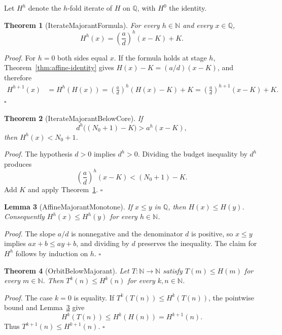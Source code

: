 \documentclass[11pt,letterpaper]{article}
\newcommand{\N}{\mathbb{N}}
\newcommand{\Q}{\mathbb{Q}}
\newcommand{\Map}[3]{#1 \colon #2 \to #3}
\newtheorem{theorem}{Theorem}
\newtheorem{lemma}[theorem]{Lemma}
\newenvironment{proof}{\noindent\textit{Proof.}}{\hfill\(\square\)}
\begin{document}
Let \(H^{h}\) denote the \(h\)-fold iterate of \(H\) on \(\Q\), with \(H^{0}\) the identity.

\begin{theorem}[IterateMajorantFormula]
\label{thm:iterate-formula}
For every \(h\in\N\) and every \(x\in\Q\),
\[
H^{h}(x)=\left(\frac{a}{d}\right)^{h}(x-K)+K.
\]
\end{theorem}

\begin{proof}
For \(h=0\) both sides equal \(x\). If the formula holds at stage \(h\), Theorem~\ref{thm:affine-identity} gives \(H(x)-K=(a/d)(x-K)\), and therefore
\begin{align*}
H^{h+1}(x)
&=H^{h}(H(x))
=\left(\frac{a}{d}\right)^{h}(H(x)-K)+K
=\left(\frac{a}{d}\right)^{h+1}(x-K)+K.
\end{align*}
\end{proof}

\begin{theorem}[IterateMajorantBelowCore]
\label{thm:iterate-budget}
If
\[
d^{h}\bigl((N_{0}+1)-K\bigr)>a^{h}(x-K),
\]
then \(H^{h}(x)<N_{0}+1\).
\end{theorem}

\begin{proof}
The hypothesis \(d>0\) implies \(d^{h}>0\). Dividing the budget inequality by \(d^{h}\) produces
\[
\left(\frac{a}{d}\right)^{h}(x-K)<(N_{0}+1)-K.
\]
Add \(K\) and apply Theorem~\ref{thm:iterate-formula}.
\end{proof}

\begin{lemma}[AffineMajorantMonotone]
\label{lem:monotone}
If \(x\le y\) in \(\Q\), then \(H(x)\le H(y)\). Consequently \(H^{h}(x)\le H^{h}(y)\) for every \(h\in\N\).
\end{lemma}

\begin{proof}
The slope \(a/d\) is nonnegative and the denominator \(d\) is positive, so \(x\le y\) implies \(ax+b\le ay+b\), and dividing by \(d\) preserves the inequality. The claim for \(H^{h}\) follows by induction on \(h\).
\end{proof}

\begin{theorem}[OrbitBelowMajorant]
\label{thm:orbit-below}
Let \(\Map{T}{\N}{\N}\) satisfy \(T(m)\le H(m)\) for every \(m\in\N\). Then \(T^{k}(n)\le H^{k}(n)\) for every \(k,n\in\N\).
\end{theorem}

\begin{proof}
The case \(k=0\) is equality. If \(T^{k}(T(n))\le H^{k}(T(n))\), the pointwise bound and Lemma~\ref{lem:monotone} give
\[
H^{k}(T(n))\le H^{k}(H(n))=H^{k+1}(n).
\]
Thus \(T^{k+1}(n)\le H^{k+1}(n)\).
\end{proof}
\end{document}
